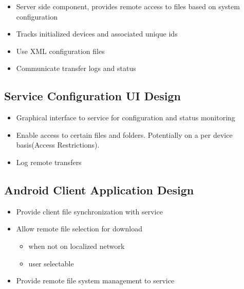 \documentclass[12pt,draft]{article}
\begin{document}
\begin{itemize}
\item Server side component, provides remote access to files based on system configuration
\item Tracks initialized devices and associated unique ids
\item Use XML configuration files
\item Communicate transfer logs and status 
\end{itemize}

\subsection{Service Configuration UI Design}

\begin{itemize}
\item Graphical interface to service for configuration and status monitoring
\item Enable access to certain files and folders.  Potentially on a per device basis(Access Restrictions).
\item Log remote transfers
\end{itemize}

\subsection{Android Client Application Design}

\begin{itemize}
\item Provide client file synchronization with service
\item Allow remote file selection for download 
	\begin{itemize}
	\item when not on localized network
	\item user selectable
	\end {itemize}
\item Provide remote file system management to service
\end{itemize}
\end{document}
